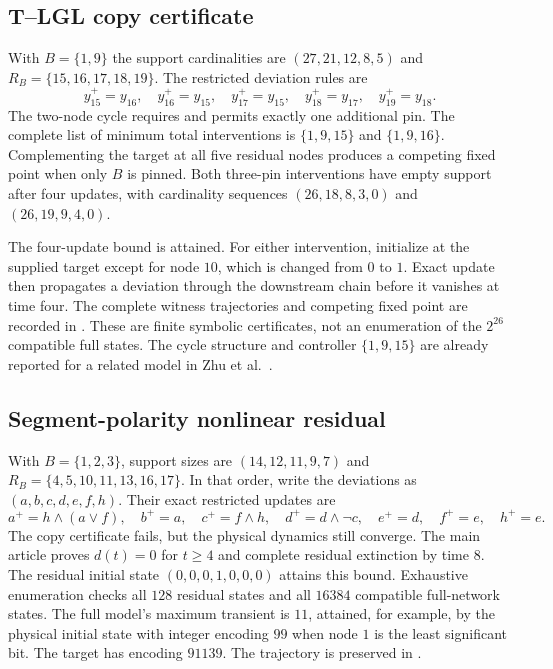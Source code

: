 \subsection{T--LGL copy certificate}
With $B=\{1,9\}$ the support cardinalities are
$(27,21,12,8,5)$ and
$R_B=\{15,16,17,18,19\}$. The restricted deviation rules are
\[
 y_{15}^+=y_{16},\quad y_{16}^+=y_{15},\quad
 y_{17}^+=y_{15},\quad y_{18}^+=y_{17},\quad y_{19}^+=y_{18}.
\]
The two-node cycle requires and permits exactly one additional pin.
The complete list of minimum total interventions is
$\{1,9,15\}$ and $\{1,9,16\}$.
Complementing the target at all five residual nodes produces a
competing fixed point when only $B$ is pinned. Both three-pin
interventions have empty support after four updates, with cardinality
sequences $(26,18,8,3,0)$ and $(26,19,9,4,0)$.

The four-update bound is attained. For either intervention, initialize
at the supplied target except for node $10$, which is changed from $0$
to $1$. Exact update then propagates a deviation through the downstream
chain before it vanishes at time four. The complete witness trajectories
and competing fixed point are recorded in
. These are finite symbolic
certificates, not an enumeration of the $2^{26}$ compatible full states.
The cycle structure and controller $\{1,9,15\}$ are already reported
for a related model in Zhu et al.\ \cite[Example 6.2]{Zhu2024}.

\subsection{Segment-polarity nonlinear residual}
With $B=\{1,2,3\}$, support sizes are $(14,12,11,9,7)$ and
$R_B=\{4,5,10,11,13,16,17\}$. In that order, write the deviations
as $(a,b,c,d,e,f,h)$. Their exact restricted updates are
\[
 a^+=h\wedge(a\vee f),\quad b^+=a,\quad c^+=f\wedge h,\quad
 d^+=d\wedge\neg c,\quad e^+=d,\quad f^+=e,\quad h^+=e.
\]
The copy certificate fails, but the physical dynamics still converge.
The main article proves $d(t)=0$ for $t\ge4$ and complete residual
extinction by time $8$. The residual initial state $(0,0,0,1,0,0,0)$
attains this bound. Exhaustive enumeration checks all $128$ residual
states and all $16384$ compatible full-network states. The full model's
maximum transient is $11$, attained, for example, by the physical initial
state with integer encoding $99$ when node $1$ is the least significant
bit. The target has encoding $91139$. The trajectory is preserved in
.

